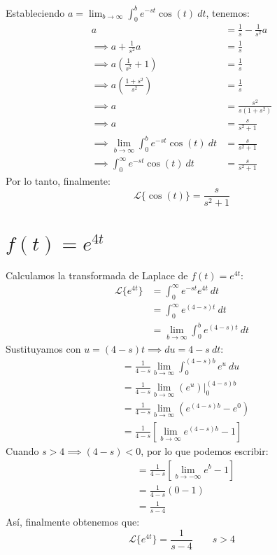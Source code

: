 \documentclass[12pt, a4paper]{article}
\begin{document}
Estableciendo \(a = \lim_{b \to \infty} \int_{0}^{b} e^{-st} \cos (t) \ dt\), tenemos:
\begin{align*}
	a &= \frac{1}{s} - \frac{1}{s ^{2}} a \\
	\implies a + \frac{1}{s ^{2}} a &= \frac{1}{s} \\
	\implies a \left(\frac{1}{s ^{2}} + 1 \right) &= \frac{1}{s} \\
	\implies a \left( \frac{1+s ^{2}}{s ^{2}} \right) &= \frac{1}{s} \\
	\implies a &= \frac{s ^{2}}{s(1+s ^{2})} \\
	\implies a &= \frac{s}{s ^{2} + 1} \\
	\implies \lim_{b \to \infty} \int_{0}^{b} e^{-st} \cos (t) \ dt &= \frac{s}{s ^{2} + 1} \\
	\implies \int_{0}^{\infty} e^{-st} \cos (t) \ dt &= \frac{s}{s ^{2} + 1}
\end{align*}
Por lo tanto, finalmente:
\[
	\mathcal{L}\{\cos (t)\} = \frac{s}{s ^{2} + 1}
\]


\setcounter{section}{10}
\section{\texorpdfstring{\(f(t)=e^{4t}\)}{f (t) = e (4t) }}

Calculamos la transformada de Laplace de \(f(t) = e^{4t}\):
\begin{align*}
	\mathcal{L}\{e^{4t}\} &= \int_{0}^{\infty} e^{-st} e^{4t}\ dt \\
	&= \int_{0}^{\infty} e^{(4-s)t} \ dt \\
	&= \lim_{b \to \infty} \int_{0}^{b} e^{(4-s)t} \ dt
\end{align*}
Sustituyamos con \(u = (4-s) t \implies du = 4-s\ dt\):
\begin{align*}
	&= \frac{1}{4-s} \lim_{b \to \infty} \int_{0}^{(4-s)b} e^{u} \ du \\
	&= \frac{1}{4-s} \lim_{b \to \infty} \left. \left( e^{u} \right)  \right|_{0}^{(4-s)b} \\
	&= \frac{1}{4-s} \lim_{b \to \infty} \left( e^{(4-s)b} - e^{0} \right) \\
	&= \frac{1}{4-s} \left[ \lim_{b \to \infty} e^{(4-s)b} - 1 \right]
\end{align*}
Cuando \(s > 4 \implies (4-s) < 0\), por lo que podemos escribir:
\begin{align*}
	&= \frac{1}{4-s} \left[ \lim_{b \to -\infty} e^{b} - 1 \right] \\
	&= \frac{1}{4-s} (0 - 1) \\
	&= \frac{1}{s-4}
\end{align*}
Así, finalmente obtenemos que:
\[
	\mathcal{L}\{e^{4t}\} = \frac{1}{s-4} \qquad s > 4
\]
\end{document}
